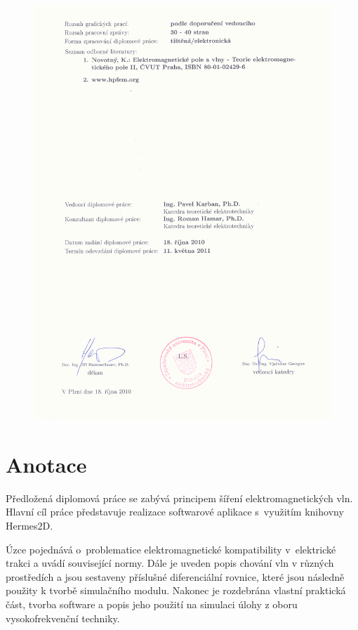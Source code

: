 \begin{figure}[!h]
	\centering
	\includegraphics[width=15cm]{zadani2.png}
\end{figure}
\newpage

\section*{Anotace}
Předložená diplomová práce se zabývá principem šíření elektromagnetických vln. Hlavní cíl práce představuje realizace softwarové aplikace s~využitím knihovny Hermes2D.

Úzce pojednává o~problematice elektromagnetické kompatibility v~elektrické trakci a uvádí související normy. Dále je uveden popis chování vln v různých prostředích a jsou sestaveny příslušné diferenciální rovnice, které jsou následně použity k tvorbě simulačního modulu.  Nakonec je rozdebrána vlastní praktická část, tvorba software a popis jeho použití na simulaci úlohy z oboru vysokofrekvenční techniky.

